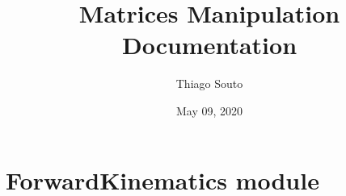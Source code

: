 \documentclass[letterpaper,10pt,english,openany,oneside]{sphinxmanual}
\title{Matrices Manipulation Documentation}
\date{May 09, 2020}
\author{Thiago Souto}
\begin{document}
\maketitle
\sphinxtableofcontents
{}\label{\detokenize{index::doc}}



\chapter{ForwardKinematics module}
\label{\detokenize{ForwardKinematics:module-Forward_Kinematics}}\label{\detokenize{ForwardKinematics:forwardkinematics-module}}\label{\detokenize{ForwardKinematics:welcome-to-matrices-manipulation-s-documentation}}\label{\detokenize{ForwardKinematics::doc}}
\end{document}
